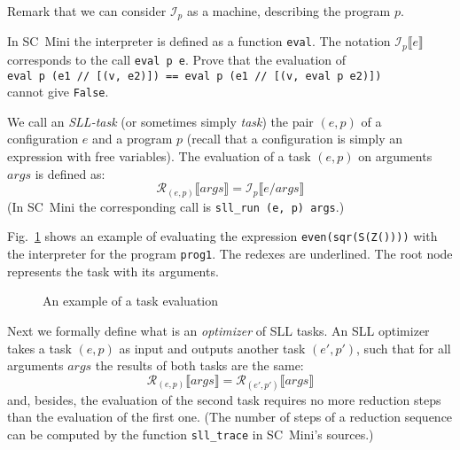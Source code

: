 Remark that we can consider $\mathcal{I}_p$ as a machine, describing the program $p$.

\begin{exercise}
In SC~Mini the interpreter is defined as a function \texttt{eval}.
The notation $\mathcal{I}_p\llbracket e \rrbracket$ corresponds to the call \texttt{eval p e}.
Prove that the evaluation of
\\
\texttt{eval p (e1 // [(v, e2)]) == eval p (e1 // [(v, eval p e2)])}
\\
cannot give \texttt{False}.
\end{exercise}

We call an \emph{SLL-task}
(or sometimes simply \emph{task}) the pair $(e, p)$
of a configuration $e$ and a program $p$
(recall that a configuration is simply an expression with free variables). 
The evaluation of a task $(e, p)$ on arguments $args$ is defined as:
\[\mathcal{R}_{(e, p)}\llbracket args\rrbracket = \mathcal{I}_p\llbracket e / args\rrbracket\]
(In SC~Mini the corresponding call is \texttt{sll\_run (e, p) args}.)


Fig.~\ref{fig-sll-int} shows an example of evaluating the expression \texttt{even(sqr(S(Z())))} 
with the interpreter for the program \texttt{prog1}.
The redexes are underlined.
The root node represents the task with its arguments.

\begin{figure}[t!]
\caption{An example of a task evaluation}
\label{fig-sll-int}

\end{figure}

Next we formally define what is an \emph{optimizer} of SLL tasks.
An SLL optimizer takes a task $(e, p)$ as input and outputs another task $(e', p')$, such that
for all arguments $args$ the results of both tasks are the same:
\[\mathcal{R}_{(e, p)}\llbracket args\rrbracket = \mathcal{R}_{(e', p')}\llbracket args\rrbracket\]
and, besides, the evaluation of the second task requires no more reduction steps than
the evaluation of the first one. 
(The number of steps of a reduction sequence can be computed by
the function \texttt{sll\_trace} in SC~Mini's sources.)

